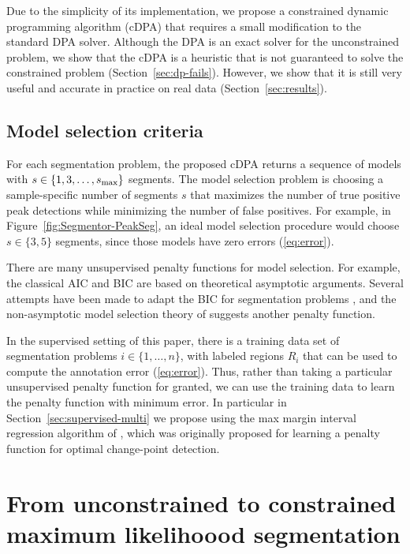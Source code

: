 \documentclass{article}
\begin{document}
Due to the simplicity of its implementation, we propose a constrained
dynamic programming algorithm (cDPA) that requires a small
modification to the standard DPA solver. Although the DPA is an exact
solver for the unconstrained problem, we show that the cDPA is a
heuristic that is not guaranteed to solve the constrained
problem (Section~\ref{sec:dp-fails}). However, we show that it is
still very useful and accurate in practice on real data
(Section~\ref{sec:results}).

\subsection{Model selection criteria}

For each segmentation problem, the proposed cDPA returns a sequence of
models with $s\in\{1, 3, \dots, s_{\text{\text{max}}}\}$ segments. The
model selection problem is choosing a sample-specific number of
segments $s$ that maximizes the number of true positive peak
detections while minimizing the number of false positives. For
example, in Figure~\ref{fig:Segmentor-PeakSeg}, an ideal model
selection procedure would choose $s\in\{3, 5\}$ segments, since those
models have zero errors (\ref{eq:error}).

There are many unsupervised penalty functions for model selection. For
example, the classical AIC \citep{Akaike73} and BIC \citep{Schwarz78} are based
on theoretical asymptotic arguments. Several attempts have been made
to adapt the BIC for segmentation problems \citep{Yao88,
  mBIC}, and the non-asymptotic model selection theory of
\citet{cleynen2013segmentation} suggests another penalty function.

In the supervised setting of this paper, there is a training data set
of segmentation problems $i\in\{1, \dots, n\}$, with labeled regions
$R_i$ that can be used to compute the annotation error
(\ref{eq:error}). Thus, rather than taking a particular unsupervised
penalty function for granted, we can use the training data to learn
the penalty function with minimum error. In particular in
Section~\ref{sec:supervised-multi} we propose using the max margin interval
regression algorithm of \citet{HOCKING-penalties}, which was
originally proposed for learning a penalty function for optimal
change-point detection.

\section{From unconstrained to constrained maximum likelihoood
  segmentation}
\label{sec:model}
\end{document}
